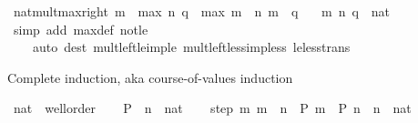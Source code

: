 \begin{isabellebody}
\ nat{\isacharunderscore}{\kern0pt}mult{\isacharunderscore}{\kern0pt}max{\isacharunderscore}{\kern0pt}right{\isacharcolon}{\kern0pt}\ {\isachardoublequoteopen}m\ {\isacharasterisk}{\kern0pt}\ max\ n\ q\ {\isacharequal}{\kern0pt}\ max\ {\isacharparenleft}{\kern0pt}m\ {\isacharasterisk}{\kern0pt}\ n{\isacharparenright}{\kern0pt}\ {\isacharparenleft}{\kern0pt}m\ {\isacharasterisk}{\kern0pt}\ q{\isacharparenright}{\kern0pt}{\isachardoublequoteclose}\isanewline
\ \ \ m\ n\ q\ {\isacharcolon}{\kern0pt}{\isacharcolon}{\kern0pt}\ nat\isanewline
%
\isadelimproof
\ \ %
\endisadelimproof
%
\isatagproof
{}\isamarkupfalse%
\ {\isacharparenleft}{\kern0pt}simp\ add{\isacharcolon}{\kern0pt}\ max{\isacharunderscore}{\kern0pt}def\ not{\isacharunderscore}{\kern0pt}le{\isacharparenright}{\kern0pt}\isanewline
\ \ \ \ {\isacharparenleft}{\kern0pt}auto\ dest{\isacharcolon}{\kern0pt}\ mult{\isacharunderscore}{\kern0pt}left{\isacharunderscore}{\kern0pt}le{\isacharunderscore}{\kern0pt}imp{\isacharunderscore}{\kern0pt}le\ mult{\isacharunderscore}{\kern0pt}left{\isacharunderscore}{\kern0pt}less{\isacharunderscore}{\kern0pt}imp{\isacharunderscore}{\kern0pt}less\ le{\isacharunderscore}{\kern0pt}less{\isacharunderscore}{\kern0pt}trans{\isacharparenright}{\kern0pt}%
\endisatagproof
{\isafoldproof}%
%
\isadelimproof
%
\endisadelimproof
%
\isadelimdocument
%
\endisadelimdocument
%
\isatagdocument
%
\isamarkuptrue%
%
\endisatagdocument
{\isafolddocument}%
%
\isadelimdocument
%
\endisadelimdocument
%
\begin{isamarkuptext}%
Complete induction, aka course-of-values induction%
\end{isamarkuptext}\isamarkuptrue%
\isamarkupfalse%
\ nat\ {\isacharcolon}{\kern0pt}{\isacharcolon}{\kern0pt}\ wellorder\isanewline
%
\isadelimproof
%
\endisadelimproof
%
\isatagproof
{}\isamarkupfalse%
\isanewline
\ \ \isamarkupfalse%
\ P\ \ n\ {\isacharcolon}{\kern0pt}{\isacharcolon}{\kern0pt}\ nat\isanewline
\ \ \isamarkupfalse%
\ step{\isacharcolon}{\kern0pt}\ {\isachardoublequoteopen}{\isacharparenleft}{\kern0pt}{\isasymAnd}m{\isachardot}{\kern0pt}\ m\ {\isacharless}{\kern0pt}\ n\ {\isasymLongrightarrow}\ P\ m{\isacharparenright}{\kern0pt}\ {\isasymLongrightarrow}\ P\ n{\isachardoublequoteclose}\ \ n\ {\isacharcolon}{\kern0pt}{\isacharcolon}{\kern0pt}\ nat\isanewline
\ \ \isamarkupfalse%

\end{isabellebody}
